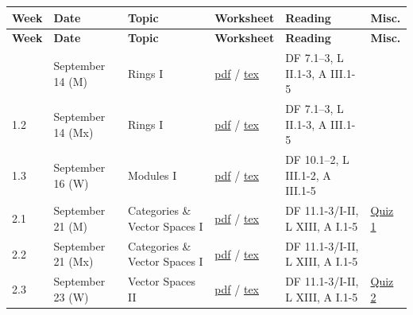 \documentclass[11pt,letterpaper]{article}
\begin{document}
\begingroup
\fontsize{9.0}{11.4}\selectfont
\setlength{\tabcolsep}{3pt}
\renewcommand{\arraystretch}{1.2}
\setlength{\LTpre}{3pt}\setlength{\LTpost}{8pt}
\begin{longtable}{L{25pt}L{86pt}L{104pt}L{54pt}L{137pt}L{50pt}}
\toprule[0.9pt]
\sffamily\bfseries\color{Forest} Week & \sffamily\bfseries\color{Forest} Date & \sffamily\bfseries\color{Forest} Topic & \sffamily\bfseries\color{Forest} Worksheet & \sffamily\bfseries\color{Forest} Reading & \sffamily\bfseries\color{Forest} Misc. \\
\midrule
\endfirsthead
\toprule[0.9pt]
\sffamily\bfseries\color{Forest} Week & \sffamily\bfseries\color{Forest} Date & \sffamily\bfseries\color{Forest} Topic & \sffamily\bfseries\color{Forest} Worksheet & \sffamily\bfseries\color{Forest} Reading & \sffamily\bfseries\color{Forest} Misc. \\
\midrule
\endhead
\bottomrule
{} & September 14 (M) & Rings I & \href{https://www.juliettebruce.xyz/teaching/101F26/1-1.pdf}{pdf} / \href{https://www.juliettebruce.xyz/teaching/101F26/1-1.tex}{tex} & DF 7.1--3, L II.1-3, A III.1-5 &  \\
1.2 & September 14 (Mx) & Rings I & \href{https://www.juliettebruce.xyz/teaching/101F26/1-1.pdf}{pdf} / \href{https://www.juliettebruce.xyz/teaching/101F26/1-1.tex}{tex} & DF 7.1--3, L II.1-3, A III.1-5 &  \\
1.3 & September 16 (W) & Modules I & \href{https://www.juliettebruce.xyz/teaching/101F26/1-2.pdf}{pdf} / \href{https://www.juliettebruce.xyz/teaching/101F26/1-2.tex}{tex} & DF 10.1--2, L III.1-2, A III.1-5 &  \\
2.1 & September 21 (M) & Categories \& Vector Spaces I & \href{https://www.juliettebruce.xyz/teaching/101F26/2-1.pdf}{pdf} / \href{https://www.juliettebruce.xyz/teaching/101F26/2-1.tex}{tex} & DF 11.1-3/I-II, L XIII, A I.1-5 & \href{https://www.juliettebruce.xyz/teaching/101F26/Quiz1.pdf}{Quiz 1} \\
2.2 & September 21 (Mx) & Categories \& Vector Spaces I & \href{https://www.juliettebruce.xyz/teaching/101F26/2-1.pdf}{pdf} / \href{https://www.juliettebruce.xyz/teaching/101F26/2-1.tex}{tex} & DF 11.1-3/I-II, L XIII, A I.1-5 &  \\
2.3 & September 23 (W) & Vector Spaces II & \href{https://www.juliettebruce.xyz/teaching/101F26/2-2.pdf}{pdf} / \href{https://www.juliettebruce.xyz/teaching/101F26/2-2.tex}{tex} & DF 11.1-3/I-II, L XIII, A I.1-5 & \href{https://www.juliettebruce.xyz/teaching/101F26/Quiz2.pdf}{Quiz 2} \\

\end{longtable}
\end{document}
